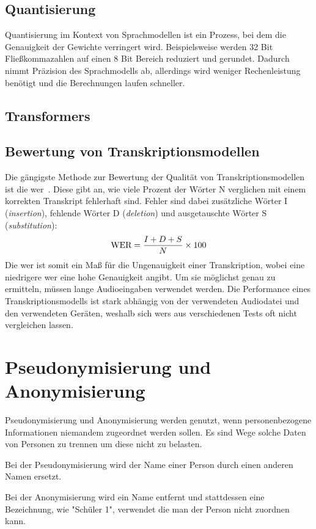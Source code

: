 \subsection{Quantisierung}
Quantisierung im Kontext von Sprachmodellen ist ein Prozess, bei dem die Genauigkeit der Gewichte verringert wird.
Beispielsweise werden 32 Bit Fließkommazahlen auf einen 8 Bit Bereich reduziert und gerundet.
Dadurch nimmt Präzision des Sprachmodells ab, allerdings wird weniger Rechenleistung benötigt und die Berechnungen laufen schneller.

\subsection{Transformers}
\subsection{Bewertung von Transkriptionsmodellen}
Die gängigste Methode zur Bewertung der Qualität von Transkriptionsmodellen ist die \ac{wer}~\citep{wer}.
Diese gibt an, wie viele Prozent der Wörter N verglichen mit einem korrekten Transkript fehlerhaft sind.
Fehler sind dabei zusätzliche Wörter I (\textit{insertion}), fehlende Wörter D (\textit{deletion}) und ausgetauschte Wörter S (\textit{substitution}):
\[\textnormal{WER} = \frac{I + D + S}{N} \times 100\]
Die \ac{wer} ist somit ein Maß für die Ungenauigkeit einer Transkription, wobei eine niedrigere \ac{wer} eine hohe Genauigkeit angibt.
Um sie möglichst genau zu ermitteln, müssen lange Audioeingaben verwendet werden.
Die Performance eines Transkriptionsmodells ist stark abhängig von der verwendeten Audiodatei und den verwendeten Geräten, weshalb sich \acp{wer} aus verschiedenen Tests oft nicht vergleichen lassen.

\section{Pseudonymisierung und Anonymisierung}
Pseudonymisierung und Anonymisierung werden genutzt, wenn personenbezogene Informationen niemandem zugeordnet werden sollen.
Es sind Wege solche Daten von Personen zu trennen um diese nicht zu belasten.

\begin{definition}[Pseudonymisierung]
Bei der Pseudonymisierung wird der Name einer Person durch einen anderen Namen ersetzt.
\end{definition}

\begin{definition}[Anonymisierung]
Bei der Anonymisierung wird ein Name entfernt und stattdessen eine Bezeichnung, wie "Schüler 1", verwendet die man der Person nicht zuordnen kann.
\end{definition}
